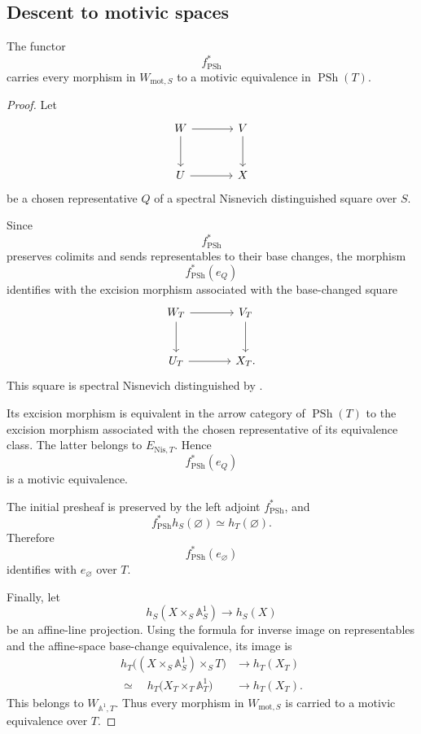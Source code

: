 \subsection{Descent to motivic spaces}

\begin{proposition}
\label{prop:base-change-preserves-motivic-generators}
The functor
\[
    f^*_{\operatorname{PSh}}
\]
carries every morphism in \(W_{\mathrm{mot},S}\) to a motivic
equivalence in \(\operatorname{PSh}(T)\).
\end{proposition}

\begin{proof}
Let
\[
\begin{tikzcd}[column sep=large, row sep=large]
    W
        \arrow[r]
        \arrow[d]
    &
    V
        \arrow[d]
    \\
    U
        \arrow[r]
    &
    X
\end{tikzcd}
\]
be a chosen representative \(Q\) of a spectral Nisnevich distinguished
square over \(S\).

Since
\[
    f^*_{\operatorname{PSh}}
\]
preserves colimits and sends representables to their base changes, the
morphism
\[
    f^*_{\operatorname{PSh}}(e_Q)
\]
identifies with the excision morphism associated with the base-changed
square
\[
\begin{tikzcd}[column sep=large, row sep=large]
    W_T
        \arrow[r]
        \arrow[d]
    &
    V_T
        \arrow[d]
    \\
    U_T
        \arrow[r]
    &
    X_T.
\end{tikzcd}
\]
This square is spectral Nisnevich distinguished by
.

Its excision morphism is equivalent in the arrow category of
\(\operatorname{PSh}(T)\) to the excision morphism associated with the
chosen representative of its equivalence class. The latter belongs to
\(E_{\mathrm{Nis},T}\). Hence
\[
    f^*_{\operatorname{PSh}}(e_Q)
\]
is a motivic equivalence.

The initial presheaf is preserved by the left adjoint
\(f^*_{\operatorname{PSh}}\), and
\[
    f^*_{\operatorname{PSh}}h_S(\varnothing)
    \simeq
    h_T(\varnothing).
\]
Therefore
\[
    f^*_{\operatorname{PSh}}(e_{\varnothing})
\]
identifies with \(e_{\varnothing}\) over \(T\).

Finally, let
\[
    h_S(X\times_S\mathbb A^1_S)
    \longrightarrow
    h_S(X)
\]
be an affine-line projection. Using the formula for inverse image on
representables and the affine-space base-change equivalence, its image
is
\[
\begin{aligned}
    h_T
    \bigl(
        (X\times_S\mathbb A^1_S)\times_ST
    \bigr)
    &\longrightarrow
    h_T(X_T)
    \\
    \simeq\quad
    h_T
    \bigl(
        X_T\times_T\mathbb A^1_T
    \bigr)
    &\longrightarrow
    h_T(X_T).
\end{aligned}
\]
This belongs to \(W_{\mathbb A^1,T}\). Thus every morphism in
\(W_{\mathrm{mot},S}\) is carried to a motivic equivalence over \(T\).
\end{proof}

